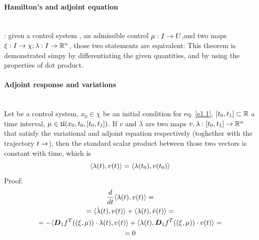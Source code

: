 \paragraph[prop 4.4]{Hamilton's and adjoint equation}\mbox{}\\
: given a control system \controlSystem,  an admissible control $\mu:I\rightarrow U$,and two maps $\xi:I\rightarrow\chi;\lambda:I\rightarrow\mathbb{R}^n$, those two statements are equivalent: 
This theorem is demonstrated simpy by differentiating the given quantities, and by using the properties of dot product. 


\paragraph[prop 4.5]{Adjoint response and variations}\mbox{}\\
 Let \controlSystem be a control system, $x_0\in\chi$ be an initial condition for eq. \ref{e1.1}, $[t_0,t_1]\subset\mathbb{R}$ a time interval, $\mu\in\mathfrak{U}(x_0,t_0,[t_0,t_1])$. If $v$ and $\lambda$ are two maps $v,\lambda:[t_0,t_1]\rightarrow\mathbb{R}^n$ that satisfy the variational and adjoint equation respectively (toghether with the trajectory $t\rightarrow$), then the standard scalar product between those two vectors is constant with time, which is
\begin{equation*}
	\langle\lambda(t),v(t)\rangle=\langle\lambda(t_0),v(t_0)\rangle
\end{equation*}
Proof:
\begin{gather*}
	\frac{d}{dt}\langle\lambda(t),v(t)\rangle=\\
	=\langle\dot{\lambda}(t),v(t)\rangle+	\langle\lambda(t),\dot{v}(t)\rangle=\\
	=-\langle\boldsymbol{D}_{1}f^T((\xi,\mu))\cdot\lambda(t),v(t)\rangle +\langle\lambda(t),\boldsymbol{D}_{1}f^T((\xi,\mu))\cdot v(t)\rangle=\\
	=0
\end{gather*}

